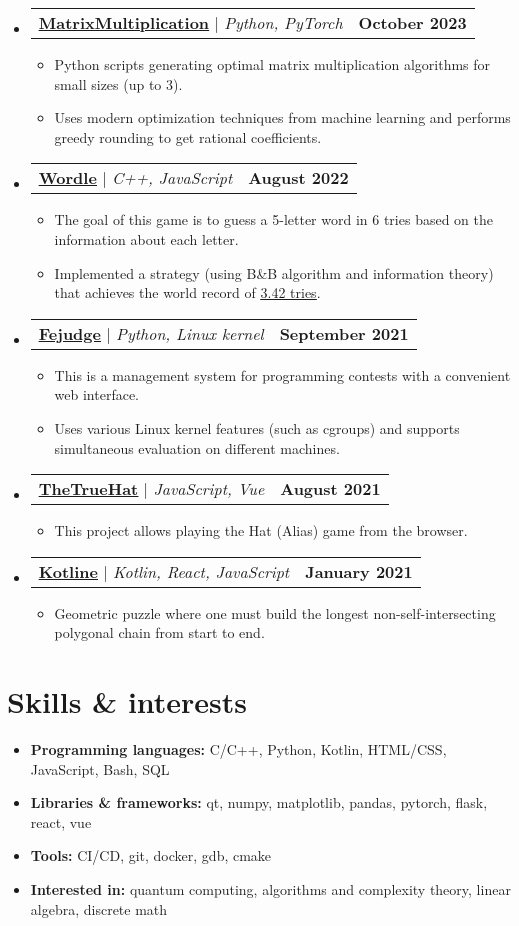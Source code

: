 \documentclass[letterpaper,11pt]{article}
\makeatletter
\newcommand{\resumeProjectHeading}[3]{
	\item
	\begin{tabular*}{1.0\textwidth}{l@{\extracolsep{\fill}}r}
		\textbf{\small #1} $|$ \emph{\small #2} & \textbf{\small #3} \\
	\end{tabular*}\vspace{-7pt}
}
\newcommand{\resumeSubHeadingListStart}{\begin{itemize}[leftmargin=0.0in, label={}]}
\newcommand{\resumeSubHeadingListEnd}{\end{itemize}}
\newcommand{\resumeItemListStart}{\begin{itemize}}
\newcommand{\resumeItemListEnd}{\end{itemize}\vspace{-8pt}}
\newcommand{\resumeItem}[1]{\item\small{{#1 \vspace{-2pt}}}}
\newcommand{\resumeSubItem}[1]{\resumeItem{#1}\vspace{-4pt}}
\makeatother
\begin{document}
\resumeSubHeadingListStart

\resumeProjectHeading
{\href{https://github.com/Qock-Foundation/matrix-multiplication}{\underline{MatrixMultiplication}}}{Python, PyTorch}{October 2023}
\resumeItemListStart
\resumeItem{Python scripts generating optimal matrix multiplication algorithms for small sizes (up to 3).}
\resumeItem{Uses modern optimization techniques from machine learning and performs greedy rounding to get rational coefficients.}
\resumeItemListEnd

\resumeProjectHeading
{\href{https://github.com/kuyanov/wordle}{\underline{Wordle}}}{C++, JavaScript}{August 2022}
\resumeItemListStart
\resumeItem{The goal of this game is to guess a 5-letter word in 6 tries based on the information about each letter.}
\resumeItem{Implemented a strategy (using B\&B algorithm and information theory) that achieves the world record of \href{https://auction-upload-files.s3.amazonaws.com/Wordle_Paper_Final.pdf}{\underline{3.42 tries}}.}
\resumeItemListEnd

\resumeProjectHeading
{\href{https://github.com/m20-sch57/fejudge}{\underline{Fejudge}}}{Python, Linux kernel}{September 2021}
\resumeItemListStart
\resumeItem{This is a management system for programming contests with a convenient web interface.}
\resumeItem{Uses various Linux kernel features (such as cgroups) and supports simultaneous evaluation on different machines.}
\resumeItemListEnd

\resumeProjectHeading
{\href{https://github.com/m20-sch57/thetruehat}{\underline{TheTrueHat}}}{JavaScript, Vue}{August 2021}
\resumeItemListStart
\resumeItem{This project allows playing the Hat (Alias) game from the browser.}
\resumeItemListEnd

\resumeProjectHeading
{\href{https://github.com/JaggedLine/kotline}{\underline{Kotline}}}{Kotlin, React, JavaScript}{January 2021}
\resumeItemListStart
\resumeItem{Geometric puzzle where one must build the longest non-self-intersecting polygonal chain from start to end.}
\resumeItemListEnd

\resumeSubHeadingListEnd


\section{Skills \& interests}

\resumeItemListStart
\resumeSubItem{\textbf{Programming languages: }{C/C++, Python, Kotlin, HTML/CSS, JavaScript, Bash, SQL}}
\resumeSubItem{\textbf{Libraries \& frameworks: }{qt, numpy, matplotlib, pandas, pytorch, flask, react, vue}}
\resumeSubItem{\textbf{Tools: }{CI/CD, git, docker, gdb, cmake}}
\resumeSubItem{\textbf{Interested in: }{quantum computing, algorithms and complexity theory, linear algebra, discrete math}}
\resumeItemListEnd
\end{document}
